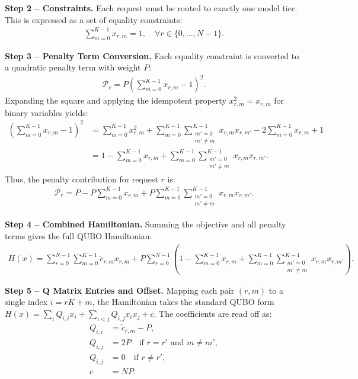 \documentclass[12pt]{article}
\begin{document}
\textbf{Step 2 -- Constraints.}
Each request must be routed to exactly one model tier. This is expressed as a set of equality constraints:
\begin{align}
    \sum_{m=0}^{K-1} x_{r,m} = 1, \quad \forall r \in \{0, \dots, N-1\}.
\end{align}

\textbf{Step 3 -- Penalty Term Conversion.}
Each equality constraint is converted to a quadratic penalty term with weight $P$:
\begin{align}
    \mathcal{P}_r = P \left( \sum_{m=0}^{K-1} x_{r,m} - 1 \right)^2.
\end{align}
Expanding the square and applying the idempotent property $x_{r,m}^2 = x_{r,m}$ for binary variables yields:
\begin{align}
    \left( \sum_{m=0}^{K-1} x_{r,m} - 1 \right)^2 &= \sum_{m=0}^{K-1} x_{r,m}^2 + \sum_{m=0}^{K-1} \sum_{\substack{m'=0 \\ m' \neq m}}^{K-1} x_{r,m} x_{r,m'} - 2 \sum_{m=0}^{K-1} x_{r,m} + 1 \\
    &= 1 - \sum_{m=0}^{K-1} x_{r,m} + \sum_{m=0}^{K-1} \sum_{\substack{m'=0 \\ m' \neq m}}^{K-1} x_{r,m} x_{r,m'}.
\end{align}
Thus, the penalty contribution for request $r$ is:
\begin{align}
    \mathcal{P}_r = P - P \sum_{m=0}^{K-1} x_{r,m} + P \sum_{m=0}^{K-1} \sum_{\substack{m'=0 \\ m' \neq m}}^{K-1} x_{r,m} x_{r,m'}.
\end{align}

\textbf{Step 4 -- Combined Hamiltonian.}
Summing the objective and all penalty terms gives the full QUBO Hamiltonian:
\begin{align}
    H(x) = \sum_{r=0}^{N-1} \sum_{m=0}^{K-1} \tilde{c}_{r,m} x_{r,m} + P \sum_{r=0}^{N-1} \left( 1 - \sum_{m=0}^{K-1} x_{r,m} + \sum_{m=0}^{K-1} \sum_{\substack{m'=0 \\ m' \neq m}}^{K-1} x_{r,m} x_{r,m'} \right).
\end{align}

\textbf{Step 5 -- Q Matrix Entries and Offset.}
Mapping each pair $(r, m)$ to a single index $i = rK + m$, the Hamiltonian takes the standard QUBO form $H(x) = \sum_{i} Q_{i,i} x_i + \sum_{i < j} Q_{i,j} x_i x_j + c$. The coefficients are read off as:
\begin{align}
    Q_{i,i} &= \tilde{c}_{r,m} - P, \\
    Q_{i,j} &= 2P \quad \text{if } r = r' \text{ and } m \neq m', \\
    Q_{i,j} &= 0 \quad \text{if } r \neq r', \\
    c &= N P.
\end{align}
\end{document}

